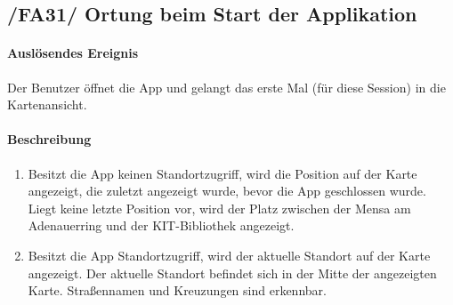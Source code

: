 \subsection*{/FA31/ Ortung beim Start der Applikation}
\label{/FA31/}
\paragraph{Auslösendes Ereignis}
Der \Gls{Benutzer} öffnet die App und gelangt das erste Mal (für diese Session) in die \Gls{Kartenansicht}.
\paragraph{Beschreibung}
\begin{enumerate}
    \item Besitzt die App keinen Standortzugriff, wird die Position auf der \Gls{Karte} angezeigt, die zuletzt angezeigt wurde, bevor die App geschlossen wurde. Liegt keine letzte Position vor, wird der Platz zwischen der Mensa am Adenauerring und der \Gls{KIT}-Bibliothek angezeigt.
    \item Besitzt die App Standortzugriff, wird der aktuelle Standort auf der \Gls{Karte} angezeigt. Der aktuelle Standort befindet sich in der Mitte der angezeigten \Gls{Karte}. Straßennamen und Kreuzungen sind erkennbar.
\end{enumerate}